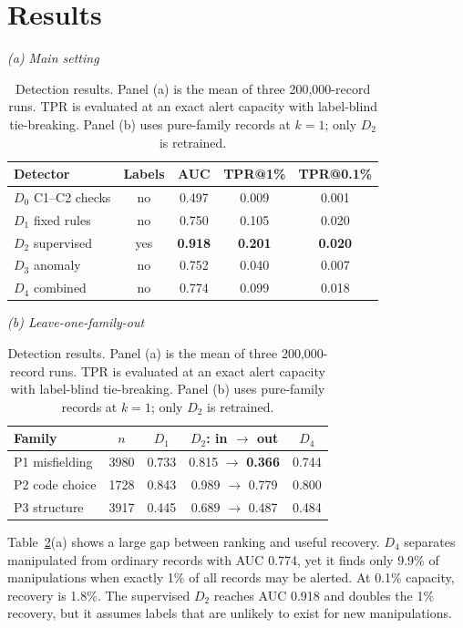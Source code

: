 \documentclass[conference]{IEEEtran}
\begin{document}
\section{Results}
\begin{table}[!t]
\caption{Detection results. Panel (a) is the mean of three 200,000-record runs.
TPR is evaluated at an exact alert capacity with label-blind tie-breaking.
Panel (b) uses pure-family records at $k=1$; only $D_2$ is retrained.}
\label{tab:results}
\centering
\scriptsize
\textit{(a) Main setting}\\[-2pt]
\begin{tabular}{@{}lcccc@{}}
\toprule
Detector & Labels & AUC & TPR@1\% & TPR@0.1\% \\
\midrule
$D_0$ C1--C2 checks & no & 0.497 & 0.009 & 0.001 \\
$D_1$ fixed rules & no & 0.750 & 0.105 & 0.020 \\
$D_2$ supervised & yes & \textbf{0.918} & \textbf{0.201} & \textbf{0.020} \\
$D_3$ anomaly & no & 0.752 & 0.040 & 0.007 \\
$D_4$ combined & no & 0.774 & 0.099 & 0.018 \\
\bottomrule
\end{tabular}

\vspace{3pt}
\textit{(b) Leave-one-family-out}\\[-2pt]
\begin{tabular}{@{}lcccc@{}}
\toprule
Family & $n$ & $D_1$ & $D_2$: in $\rightarrow$ out & $D_4$ \\
\midrule
P1 misfielding & 3980 & 0.733 & 0.815 $\rightarrow$ \textbf{0.366} & 0.744 \\
P2 code choice & 1728 & 0.843 & 0.989 $\rightarrow$ 0.779 & 0.800 \\
P3 structure & 3917 & 0.445 & 0.689 $\rightarrow$ 0.487 & 0.484 \\
\bottomrule
\end{tabular}
\end{table}

Table~\ref{tab:results}(a) shows a large gap between ranking and useful
recovery. $D_4$ separates manipulated from ordinary records with AUC 0.774,
yet it finds only 9.9\% of manipulations when exactly 1\% of all records may be
alerted. At 0.1\% capacity, recovery is 1.8\%. The supervised $D_2$ reaches
AUC 0.918 and doubles the 1\% recovery, but it assumes labels that are unlikely
to exist for new manipulations.
\end{document}
